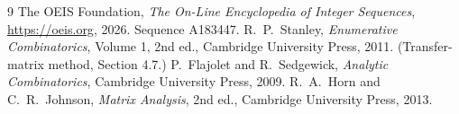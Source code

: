 \documentclass[11pt,a4paper]{article}
\theoremstyle{plain}
\theoremstyle{definition}
\begin{document}
\begin{thebibliography}{9}
 The OEIS Foundation, \emph{The On-Line Encyclopedia of Integer
Sequences}, \url{https://oeis.org}, 2026. Sequence A183447.
 R.~P.~Stanley, \emph{Enumerative Combinatorics}, Volume 1, 2nd ed.,
Cambridge University Press, 2011. (Transfer-matrix method, Section 4.7.)
 P.~Flajolet and R.~Sedgewick, \emph{Analytic Combinatorics}, Cambridge
University Press, 2009.
 R.~A.~Horn and C.~R.~Johnson, \emph{Matrix Analysis}, 2nd ed., Cambridge
University Press, 2013.
\end{thebibliography}
\end{document}
